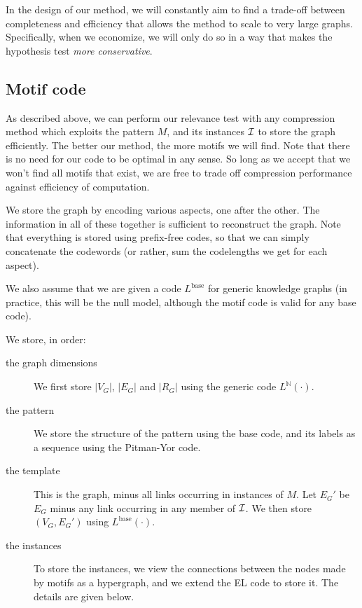 \documentclass[letterpaper]{article} %
\newcommand{\N}{{\mathbb N}}
\newcommand{\I}{{\cal I}}
\begin{document}
In the design of our method, we will constantly aim to find a trade-off between completeness and efficiency that allows the method to scale to very large graphs. Specifically, when we economize, we will only do so in a way that makes the hypothesis test \emph{more conservative}.

\subsection{Motif code}

As described above, we can perform our relevance test with any compression method which exploits the pattern $M$, and its instances $\I$ to store the graph efficiently. The better our method, the more motifs we will find. Note that there is no need for our code to be optimal in any sense. So long as we accept that we won't find all motifs that exist, we are free to trade off compression performance against efficiency of computation.

We store the graph by encoding various aspects, one after the other. The information in all of these together is sufficient to reconstruct the graph. Note that everything is stored using prefix-free codes, so that we can simply concatenate the codewords (or rather, sum the codelengths we get for each aspect).

We also assume that we are given a code $L^\text{base}$ for generic knowledge graphs (in practice, this will be the null model, although the motif code is valid for any base code).

We store, in order:

\begin{description}
 \item[the graph dimensions] We first store $|V_G|$, $|E_G|$ and $|R_G|$ using the generic code $L^{\N}(\cdot)$. 
 \item[the pattern] We store the structure of the pattern using the base code, and its labels as a sequence using the Pitman-Yor code.
 \item[the template] This is the graph, minus all links occurring in instances of $M$. Let $E_G'$ be $E_G$ minus any link occurring in any member of $\cal I$. We then store $(V_G, E_G')$ using $L^\text{base}(\cdot)$.
 \item[the instances] To store the instances, we view the connections between the nodes made by motifs as a hypergraph, and we extend the EL code to store it. The details are given below.
\end{description}
\end{document}

